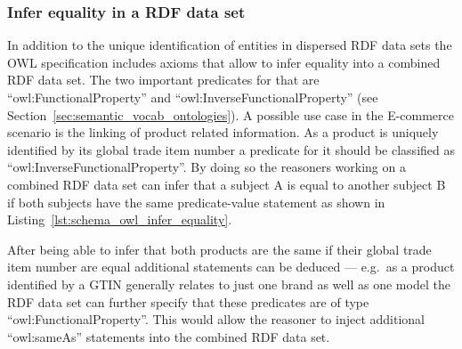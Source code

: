 \subsubsection{Infer equality in a \gls{RDF} data set}
\label{subsub:info_unique_infer}

In addition to the unique identification of entities in dispersed \gls{RDF} data sets the \gls{OWL} specification includes axioms that allow to infer equality into a combined \gls{RDF} data set. The two important predicates for that are ``owl:FunctionalProperty'' and ``owl:InverseFunctionalProperty'' (see Section~\ref{sec:semantic_vocab_ontologies}). A possible use case in the \gls{E-commerce} scenario is the linking of product related information. As a product is uniquely identified by its global trade item number a predicate for it should be classified as ``owl:InverseFunctionalProperty''. By doing so the reasoners working on a combined \gls{RDF} data set can infer that a subject A is equal to another subject B if both subjects have the same predicate-value statement as shown in Listing~\ref{lst:schema_owl_infer_equality}. \@


After being able to infer that both products are the same if their global trade item number are equal additional statements can be deduced --- e.g.\ as a product identified by a \gls{GTIN} generally relates to just one brand as well as one model the \gls{RDF} data set can further specify that these predicates are of type ``owl:FunctionalProperty''. This would allow the reasoner to inject additional ``owl:sameAs'' statements into the combined \gls{RDF} data set.  


